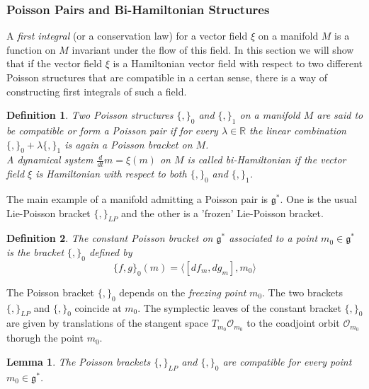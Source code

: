 \documentclass{article}
\newtheorem{defn}{Definition}
\newtheorem{lem}{Lemma}
\begin{document}
\subsubsection{Poisson Pairs and Bi-Hamiltonian Structures}

\indent A \textit{first integral} (or a conservation law) for a vector field $\xi$ on a manifold $M$ is a function on $M$ invariant under the flow of this field. In this section we will show that if the vector field $\xi$ is a Hamiltonian vector field with respect to two different Poisson structures that are compatible in a certan sense, there is a way of constructing first integrals of such a field.


\begin{defn}

	Two Poisson structures $ \{ , \}_0$ and $ \{ , \}_1$ on a manifold $M$ are said to be \textit{compatible} or form a \textit{Poisson pair} if for every $\lambda \in \mathbb{R}$ the linear combination $ \{ , \}_0 + \lambda \{ , \}_1$ is again a Poisson bracket on $M$.\\
	\indent A dynamical system $ \frac{d}{dt}m = \xi(m)$ on $M$ is called \textit{bi-Hamiltonian} if the vector field $\xi$ is Hamiltonian with respect to both $ \{ , \}_0$ and $ \{ , \}_1$.

\end{defn}

\indent The main example of a manifold admitting a Poisson pair is $ \mathfrak{g}^*$. One is the usual Lie-Poisson bracket $ \{ , \}_{LP}$ and the other is a 'frozen' Lie-Poisson bracket.


\begin{defn}

The constant Poisson bracket on $ \mathfrak{g}^*$ associated to a point $m_0 \in \mathfrak{g}^*$ is the bracket $ \{ , \}_0$ defined by 
\[
	\{ f,g \}_0 (m) = \langle [df_m, dg_m], m_0 \rangle 
\]


\end{defn}

\indent The Poisson bracket $ \{ , \}_0$ depends on the \textit{freezing point} $m_0$. The two brackets $ \{ , \}_{LP}$ and $ \{ , \}_0$ coincide at $m_0$. The symplectic leaves of the constant bracket $ \{ , \}_0$ are given by translations of the stangent space $ T_{m_0} \mathcal{O}_{m_0}$ to the coadjoint orbit $ \mathcal{O}_{m_0}$ thorugh the point $m_0$.


\begin{lem}

	The Poisson brackets $ \{ , \}_{LP}$ and $ \{ , \}_0$ are compatible for every point $m_0 \in \mathfrak{g}^*$.

\end{lem}
\end{document}
